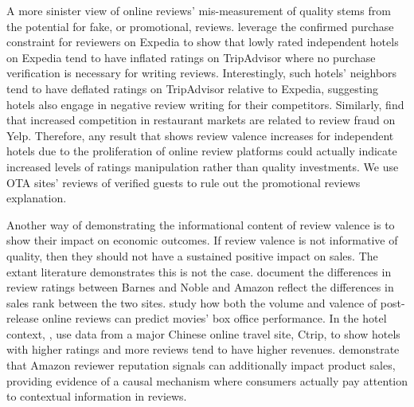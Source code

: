 \documentclass[mksc,blindrev]{informs3} %
\begin{document}
A more sinister view of online reviews' mis-measurement of quality stems from the potential for fake, or promotional, reviews. \citet{mayzlin2014promotional} leverage the confirmed purchase constraint for reviewers on Expedia to show that lowly rated independent hotels on Expedia tend to have inflated ratings on TripAdvisor where no purchase verification is necessary for writing reviews. Interestingly, such hotels' neighbors tend to have deflated ratings on TripAdvisor relative to Expedia, suggesting hotels also engage in negative review writing for their competitors. Similarly, \citet{luca2016fake} find that increased competition in restaurant markets are related to review fraud on Yelp. Therefore, any result that shows review valence increases for independent hotels due to the proliferation of online review platforms could actually indicate increased levels of ratings manipulation rather than quality investments. We use OTA sites' reviews of verified guests to rule out the promotional reviews explanation.

Another way of demonstrating the informational content of review valence is to show their impact on economic outcomes. If review valence is not informative of quality, then they should not have a sustained positive impact on sales. The extant literature demonstrates this is not the case. \citet{chevalier2006effect} document the differences in review ratings between Barnes and Noble and Amazon reflect the differences in sales rank between the two sites. \citet{dellarocas2007exploring} study how both the volume and valence of post-release online reviews can predict movies' box office performance. In the hotel context, \citet{ye2009impact}, use data from a major Chinese online travel site, Ctrip, to show hotels with higher ratings and more reviews tend to have higher revenues. \citet{hu2008online} demonstrate that Amazon reviewer reputation signals can additionally impact product sales, providing evidence of a causal mechanism where consumers actually pay attention to contextual information in reviews. 
\end{document}

